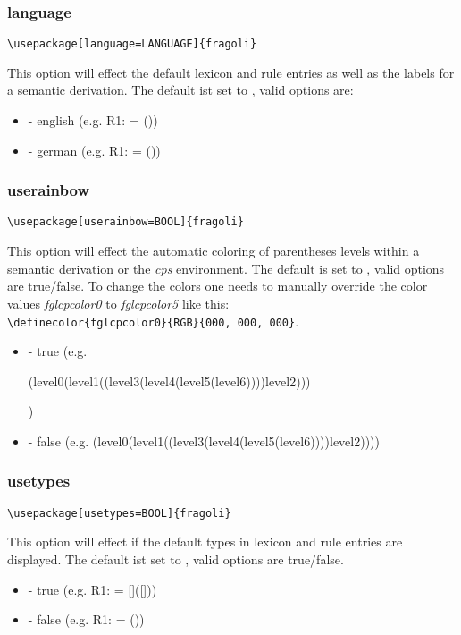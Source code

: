 \documentclass[10pt, a4paper]{article}
\newenvironment{itemizeexample}{
	\begin{itemize}
		\setlength\itemsep{-.5em}
	}
	{
	\end{itemize}
}
\begin{document}
	\subsubsection{language}
	\begin{lstlisting}[style=A]
	\usepackage[language=LANGUAGE]{fragoli}
	\end{lstlisting}
	This option will effect the default lexicon and rule entries as well as the labels for a semantic derivation. The default ist set to \texttt{}, valid options are:
	\begin{itemizeexample}
		\item[-] english (e.g. R1:  = (\lambheN{}))
		\item[-] german (e.g. R1:  = (\lambheN{}))
	\end{itemizeexample}
	\subsubsection{userainbow}
	\begin{lstlisting}[style=A]
	\usepackage[userainbow=BOOL]{fragoli}
	\end{lstlisting}
	This option will effect the automatic coloring of parentheses levels within a semantic derivation or the \textit{cps} environment. The default is set to \texttt{}, valid options are true/false. To change the colors one needs to manually override the color values \textit{fglcpcolor0} to \textit{fglcpcolor5} like this: \\\verb=\definecolor{fglcpcolor0}{RGB}{000, 000, 000}=.
	\begin{itemizeexample}
		\item[-] true (e.g. \begin{cps}(level0(level1((level3(level4(level5(level6))))level2)))\end{cps})
		\item[-] false (e.g. (level0(level1((level3(level4(level5(level6))))level2))))
	\end{itemizeexample}
	\subsubsection{usetypes}
	\begin{lstlisting}[style=A]
	\usepackage[usetypes=BOOL]{fragoli}
	\end{lstlisting}
	This option will effect if the default types in lexicon and rule entries are displayed. The default ist set to \texttt{}, valid options are true/false.
	\begin{itemizeexample}
		\item[-] true (e.g. R1:  = []([]\lambheN[x][\type{e}]))
		\item[-] false (e.g. R1:  = (\lambheN{}))
	\end{itemizeexample}
\end{document}
